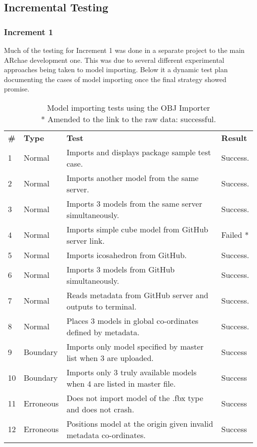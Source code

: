 \documentclass[12pt, a4paper]{article}
\begin{document}
\subsection{Incremental Testing}

\subsubsection{Increment 1}
Much of the testing for Increment 1 was done in a separate project to the main ARchae development one. This was due to several different experimental approaches being taken to model importing. Below it a dynamic test plan documenting the cases of model importing once the final strategy showed promise. 

\begin{table}[H]
\footnotesize
\begin{tabular}{llll}
\textbf{\#} & \textbf{Type} & \textbf{Test}                                               & \textbf{Result} \\
1          & Normal        & Imports and displays package sample test case.              & Success.        \\
2          & Normal        & Imports another model from the same server.                 & Success.        \\
3          & Normal        & Imports 3 models from the same server simultaneously.       & Success.        \\
4  & Normal    & Imports simple cube model from GitHub server link.                      & Failed * \\
5          & Normal        & Imports icosahedron from GitHub.                            & Success.        \\
6          & Normal        & Imports 3 models from GitHub simultaneously.                & Success.        \\
7          & Normal        & Reads metadata from GitHub server and outputs to terminal.  & Success.        \\
8          & Normal        & Places 3 models in global co-ordinates defined by metadata. & Success.        \\
9          & Boundary      & Imports only model specified by master list when 3 are uploaded.   & Success         \\
10 & Boundary  & Imports only 3 truly available models when 4 are listed in master file. & Success                                                           \\
11         & Erroneous     & Does not import model of the .fbx type and does not crash.  & Success         \\
12 & Erroneous & Positions model at the origin given invalid metadata co-ordinates.      & Success 
\end{tabular}
\caption{Model importing tests using the OBJ Importer \\ * Amended to the link to the raw data: successful.}
\end{table}
\end{document}
